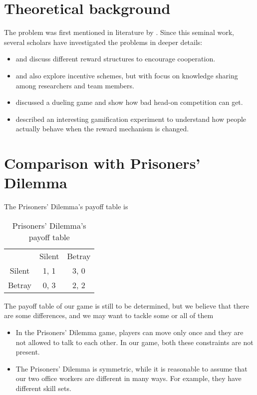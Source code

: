 \documentclass[11pt, a4paper]{article}
\begin{document}
	\section{Theoretical background}
	The problem was first mentioned in literature by \cite{Drago1991}. Since this seminal work, several scholars have investigated the problems in deeper details:
	\begin{itemize}
		\item \cite{Drago1998} and \cite{Kistruck2016} discuss different reward structures to encourage cooperation.
		\item \cite{Banerjee2014} and \cite{Chakravarti2015} also explore incentive schemes, but with focus on knowledge sharing among researchers and team members.
		\item \cite{Immorlica2011} discussed a dueling game and show how bad head-on competition can get.
		\item \cite{Landers2015} described an interesting gamification experiment to understand how people actually behave when the reward mechanism is changed.
		
	\end{itemize}
	
	\section{Comparison with Prisoners' Dilemma}
	The Prisoners' Dilemma's payoff table is 
	\begin{table}[h]
		\centering
		\caption{Prisoners' Dilemma's payoff table}
		\begin{tabular}{c c c}
			& Silent & Betray \\
			Silent  & 1, 1    & 3, 0     \\
			Betray  & 0, 3    & 2, 2
		\end{tabular}
	\end{table}
	
	The payoff table of our game is still to be determined, but we believe that there are some differences, and we may want to tackle some or all of them
	\begin{itemize}
		\item In the Prisoners' Dilemma game, players can move only once and they are not allowed to talk to each other. In our game, both these constraints are not present.
		\item The Prisoners' Dilemma is symmetric, while it is reasonable to assume that our two office workers are different in many ways. For example, they have different skill sets.
	\end{itemize}
\end{document}
